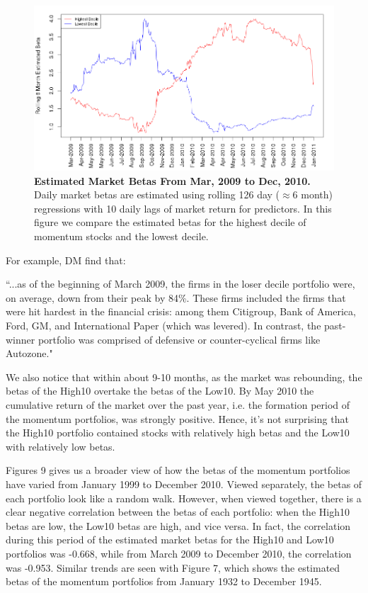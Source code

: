 \documentclass[12pt]{article}
\begin{document}
\begin{figure}[h] %
\centering
\caption{\textbf{Estimated Market Betas From Mar, 2009 to Dec, 2010.} {\footnotesize Daily market betas are estimated using rolling 126 day ($\approx6$ month) regressions with 10 daily lags of market return for predictors. In this figure we compare the estimated betas for the highest decile of momentum stocks and the lowest decile.}}
\includegraphics[scale=0.45]{betas2009.png}
\end{figure}

For example, DM find that:

{\footnotesize``...as of the beginning of March 2009, the firms in the loser decile portfolio were, on average, down from their peak by 84\%. These firms included the firms that were hit hardest in the financial crisis: among them Citigroup, Bank of America, Ford, GM, and International Paper (which was levered). In contrast, the past-winner portfolio was comprised of defensive or counter-cyclical firms like Autozone."}

We also notice that within about 9-10 months, as the market was rebounding, the betas of the High10 overtake the betas of the Low10. By May 2010 the cumulative return of the market over the past year, i.e. the formation period of the momentum portfolios, was strongly positive. Hence, it's not surprising that the High10 portfolio contained stocks with relatively high betas and the Low10 with relatively low betas.

Figures 9 gives us a broader view of how the betas of the momentum portfolios have varied from January 1999 to December 2010. Viewed separately, the betas of each portfolio look like a random walk. However, when viewed together, there is a clear negative correlation between the betas of each portfolio: when the High10 betas are low, the Low10 betas are high, and vice versa. In fact, the correlation during this period of the estimated market betas for the High10 and Low10 portfolios was -0.668, while from March 2009 to December 2010, the correlation was -0.953. Similar trends are seen with Figure 7, which shows the estimated betas of the momentum portfolios from January 1932 to December 1945.
\end{document}
